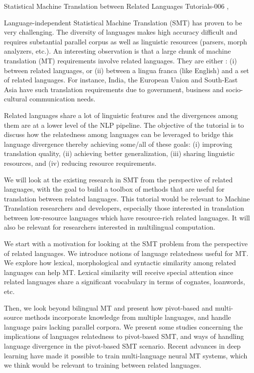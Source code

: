 \begin{tutorial}
  {Statistical Machine Translation between Related Languages}
  {Tutorials-006}
  {\daydateyear, \tutorialafternoontime}
  {\TutLocF}

Language-independent Statistical Machine Translation (SMT) has proven to be very challenging. The diversity of languages makes high accuracy difficult and requires substantial parallel corpus as well as linguistic resources (parsers, morph analyzers, etc.). An interesting observation is that a large chunk of machine translation (MT) requirements involve related languages. They are either : (i) between related languages, or (ii) between a lingua franca (like English) and a set of related languages. For instance, India, the European Union and South-East Asia have such translation requirements due to government, business and socio-cultural communication needs.

Related languages share a lot of linguistic features and the divergences among them are at a lower level of the NLP pipeline. The objective of the tutorial is to discuss how the relatedness among languages can be leveraged to bridge this language divergence thereby achieving some/all of these goals: (i) improving translation quality, (ii) achieving better generalization, (iii) sharing linguistic resources, and (iv) reducing resource requirements.

We will look at the existing research in SMT from the perspective of related languages, with the goal to build a toolbox of methods that are useful for translation between related languages. This tutorial would be relevant to Machine Translation researchers and developers, especially those interested in translation between low-resource languages which have resource-rich related languages. It will also be relevant for researchers interested in multilingual computation.

We start with a motivation for looking at the SMT problem from the perspective of related languages. We introduce notions of language relatedness useful for MT. We explore how lexical, morphological and syntactic similarity among related languages can help MT. Lexical similarity will receive special attention since related languages share a significant vocabulary in terms of cognates, loanwords, etc.

Then, we look beyond bilingual MT and present how pivot-based and multi-source methods incorporate knowledge from multiple languages, and handle language pairs lacking parallel corpora. We present some studies concerning the implications of languages relatedness to pivot-based SMT, and ways of handling language divergence in the pivot-based SMT scenario. Recent advances in deep learning have made it possible to train multi-language neural MT systems, which we think would be relevant to training between related languages.


\end{tutorial}
